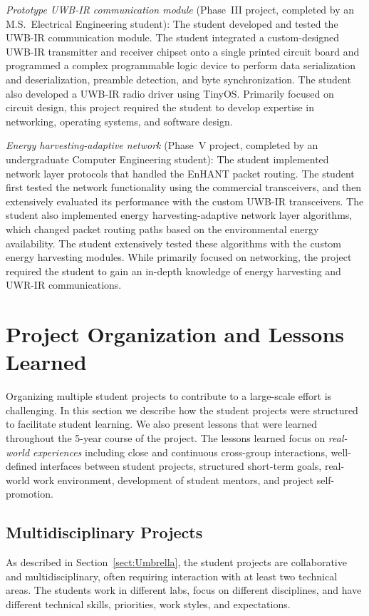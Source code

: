 \documentclass[journal,twopages]{IEEEtran}
\newenvironment{myitemize}{\begin{list}{}{\renewcommand{\leftmargin}{0.2in}}}{\end{list}}
\begin{document}
\begin{myitemize}
\item \emph{Prototype UWB-IR communication module} (Phase~III proj\-ect, completed by an  M.S.\ Electrical Engineering student):
    The student developed and tested the \mbox{UWB-IR} communication module. The student integrated a custom-designed \mbox{UWB-IR} transmitter and receiver chipset onto a single printed circuit board and programmed a complex programmable logic device     to perform data serialization and deserialization, preamble detection, and byte synchronization. The student also developed a UWB-IR radio driver using TinyOS. Primarily focused on circuit design, this project required the student to develop expertise in networking, operating systems, and software design.

\item \emph{Energy harvesting-adaptive network} (Phase~V proj\-ect, completed by an undergraduate Computer Engineering student): The student implemented network layer protocols that handled the EnHANT packet routing.
    The student first tested the network functionality using the commercial transceivers, and then
    extensively evaluated its performance with the custom \mbox{UWB-IR} transceivers.
    The student also implemented energy harvesting-adaptive network layer algorithms, which changed packet routing paths based on the environmental energy availability. The student extensively tested these algorithms with the custom energy harvesting modules.
    While primarily focused on networking, the project required the student to gain an in-depth knowledge of energy harvesting and \mbox{UWR-IR} communications.
\end{myitemize}

 
\section{Project Organization and Lessons Learned}
\label{sect:Approach}\label{sect:Lessons}
Organizing multiple student projects to contribute to a large-scale effort is challenging.
In this section we describe how the student projects were structured to facilitate student learning. We also present lessons that were learned throughout the \mbox{5-year} course of the project.
The lessons learned focus on \emph{real-world experiences} including close and continuous cross-group interactions, well-defined interfaces between student projects, structured short-term goals, real-world work environment, development of student mentors, and project self-promotion.

\subsection{Multidisciplinary Projects}
As described in Section~\ref{sect:Umbrella}, the student projects are collaborative and multidisciplinary, often requiring interaction with at least two technical areas. The students work in different labs, focus on different disciplines, and have different technical skills, priorities, work styles, and expectations.
\end{document}
